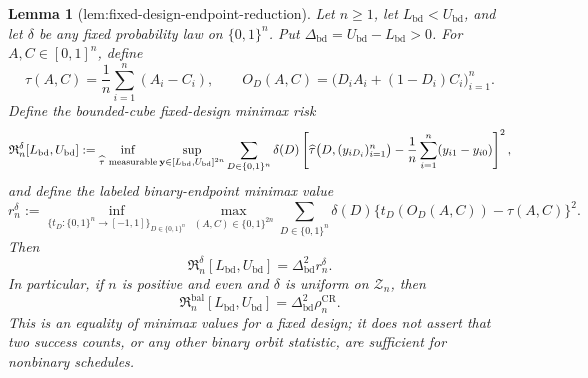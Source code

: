 \documentclass{article}
\newtheorem{lemma}{Lemma}
\begin{document}
\begin{lemma}[lem:fixed-design-endpoint-reduction]\label{lem:fixed-design-endpoint-reduction}
Let \(n\geq 1\), let \(L_{\mathrm{bd}}<U_{\mathrm{bd}}\), and let \(\delta\) be any fixed probability law on \(\{0,1\}^n\).  Put \(\Delta_{\mathrm{bd}}=U_{\mathrm{bd}}-L_{\mathrm{bd}}>0\).  For \(A,C\in[0,1]^n\), define
\[
 \tau(A,C)=\frac1n\sum_{i=1}^n(A_i-C_i),
 \qquad O_D(A,C)=\bigl(D_iA_i+(1-D_i)C_i\bigr)_{i=1}^n.
\]
Define the bounded-cube fixed-design minimax risk
\[
 \mathfrak R_n^\delta[L_{\mathrm{bd}},U_{\mathrm{bd}}]
 :=\inf_{\widehat\tau\ {\rm measurable}}
 \sup_{\mathbf y\in[L_{\mathrm{bd}},U_{\mathrm{bd}}]^{2n}}
 \sum_{D\in\{0,1\}^n}\delta(D)
 \left[\widehat\tau\bigl(D,(y_{iD_i})_{i=1}^n\bigr)
 -\frac1n\sum_{i=1}^n(y_{i1}-y_{i0})\right]^2,
\]
and define the labeled binary-endpoint minimax value
\[
 r_n^\delta
 :=\inf_{\{t_D:\{0,1\}^n\to[-1,1]\}_{D\in\{0,1\}^n}}
 \max_{(A,C)\in\{0,1\}^{2n}}
 \sum_{D\in\{0,1\}^n}\delta(D)
 \{t_D(O_D(A,C))-\tau(A,C)\}^2.
\]
Then
\[
 \mathfrak R_n^\delta[L_{\mathrm{bd}},U_{\mathrm{bd}}]
 =\Delta_{\mathrm{bd}}^2 r_n^\delta.
\]
In particular, if \(n\) is positive and even and \(\delta\) is uniform on \(\mathcal Z_n\), then
\[
 \mathfrak R_n^{\mathrm{bal}}[L_{\mathrm{bd}},U_{\mathrm{bd}}]
 =\Delta_{\mathrm{bd}}^2\rho_n^{\mathrm{CR}}.
\]
This is an equality of minimax values for a fixed design; it does not assert that two success counts, or any other binary orbit statistic, are sufficient for nonbinary schedules.
\end{lemma}
\end{document}
